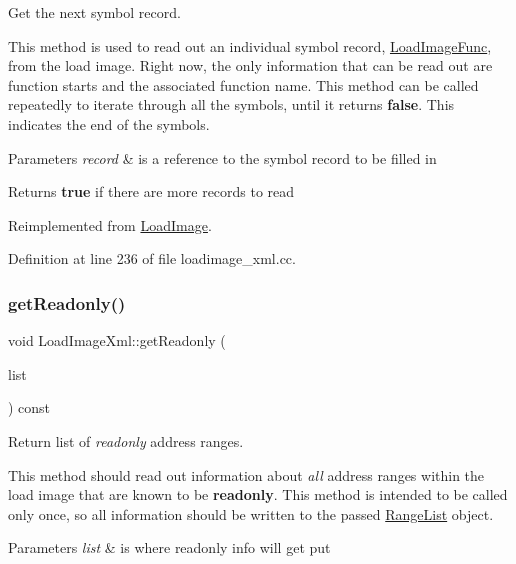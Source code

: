 Get the next symbol record. 

This method is used to read out an individual symbol record, \mbox{\hyperlink{struct_load_image_func}{Load\+Image\+Func}}, from the load image. Right now, the only information that can be read out are function starts and the associated function name. This method can be called repeatedly to iterate through all the symbols, until it returns {\bfseries{false}}. This indicates the end of the symbols. 
\begin{DoxyParams}{Parameters}
{\em record} & is a reference to the symbol record to be filled in \\
\hline
\end{DoxyParams}
\begin{DoxyReturn}{Returns}
{\bfseries{true}} if there are more records to read 
\end{DoxyReturn}


Reimplemented from \mbox{\hyperlink{class_load_image_af4a887cf44c719c576bb05605a4c5c7e}{Load\+Image}}.



Definition at line 236 of file loadimage\+\_\+xml.\+cc.

\mbox{\label{class_load_image_xml_adab4a4d8e035047641c5a1613e9386d6}} 
\subsubsection{\texorpdfstring{getReadonly()}{getReadonly()}}
{\footnotesize\ttfamily void Load\+Image\+Xml\+::get\+Readonly (\begin{DoxyParamCaption}\item[{\mbox{\hyperlink{class_range_list}{Range\+List}} \&}]{list }\end{DoxyParamCaption}) const\hspace{0.3cm}{\ttfamily [virtual]}}



Return list of {\itshape readonly} address ranges. 

This method should read out information about {\itshape all} address ranges within the load image that are known to be {\bfseries{readonly}}. This method is intended to be called only once, so all information should be written to the passed \mbox{\hyperlink{class_range_list}{Range\+List}} object. 
\begin{DoxyParams}{Parameters}
{\em list} & is where readonly info will get put \\
\hline
\end{DoxyParams}


